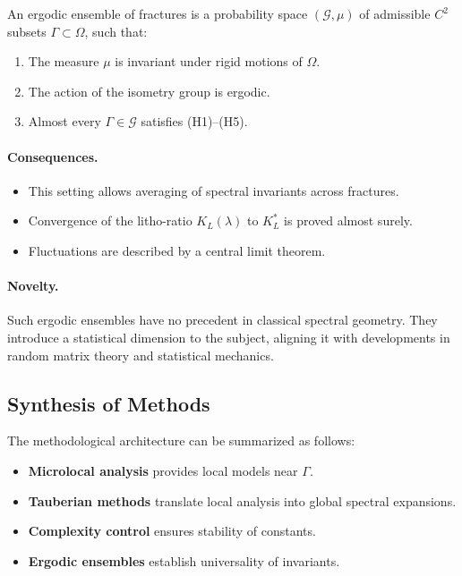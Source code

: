 \begin{definition}
An ergodic ensemble of fractures is a probability space
$(\mathcal{G},\mu)$ of admissible $C^2$ subsets $\Gamma\subset\Omega$, such
that:
\begin{enumerate}
  \item The measure $\mu$ is invariant under rigid motions of $\Omega$.
  \item The action of the isometry group is ergodic.
  \item Almost every $\Gamma\in\mathcal{G}$ satisfies (H1)--(H5).
\end{enumerate}
\end{definition}

\paragraph{Consequences.}
\begin{itemize}
  \item This setting allows averaging of spectral invariants across fractures.
  \item Convergence of the litho-ratio $K_L(\lambda)$ to $K_L^\ast$ is proved
  almost surely.
  \item Fluctuations are described by a central limit theorem.
\end{itemize}

\paragraph{Novelty.}
Such ergodic ensembles have no precedent in classical spectral geometry. They
introduce a statistical dimension to the subject, aligning it with developments
in random matrix theory and statistical mechanics.

\subsection{Synthesis of Methods}

The methodological architecture can be summarized as follows:

\begin{itemize}
  \item \textbf{Microlocal analysis} provides local models near $\Gamma$.
  \item \textbf{Tauberian methods} translate local analysis into global
  spectral expansions.
  \item \textbf{Complexity control} ensures stability of constants.
  \item \textbf{Ergodic ensembles} establish universality of invariants.
\end{itemize}

